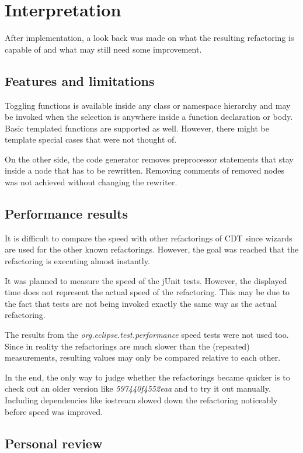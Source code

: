 \chapter{Interpretation}
\thispagestyle{fancy}

After implementation, a look back was made on what the resulting refactoring is 
capable of and what may still need some improvement.

\section{Features and limitations}

Toggling functions is available inside any class or namespace hierarchy and may 
be invoked when the selection is anywhere inside a function declaration or body. 
Basic templated functions are supported as well. However, there might be 
template special cases that were not thought of.

On the other side, the code generator removes preprocessor statements that stay 
inside a node that has to be rewritten. Removing comments of removed nodes was 
not achieved without changing the rewriter.

\section{Performance results}

It is difficult to compare the speed with other refactorings of CDT since wizards 
are used for the other known refactorings. However, the goal was reached that 
the refactoring is executing almost instantly.

It was planned to measure the speed of the jUnit tests. However, the displayed 
time does not represent the actual speed of the refactoring. This may be due to 
the fact that tests are not being invoked exactly the same way as the actual 
refactoring.

The results from the \textit{org.eclipse.test.performance} speed tests were not 
used too. Since in reality the refactorings are much slower than the 
(repeated) measurements, resulting values may only be compared relative to each 
other.

In the end, the only way to judge whether the refactorings became quicker is to 
check out an older version like \textit{597440f4552eaa} and to try it out 
manually. Including dependencies like iostream slowed down the refactoring 
noticeably before speed was improved.

\section{Personal review}

